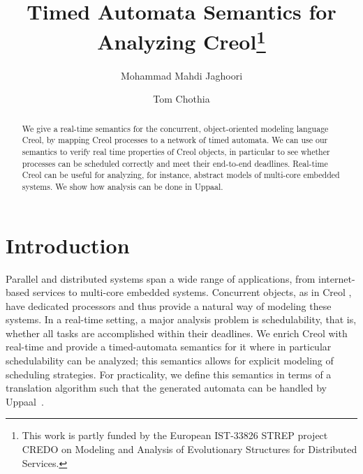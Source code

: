 \documentclass[copyright,creativecommons]{eptcs}
\theoremstyle{definition}
\newcommand{\Uppaal}{{\sc Uppaal}\xspace}
\begin{document}
\title{Timed Automata Semantics for Analyzing Creol\thanks{This work is partly funded by the European IST-33826 STREP project CREDO on Modeling and Analysis of Evolutionary Structures for Distributed Services.}}

\def\titlerunning{Timed Automata Semantics for Analyzing Creol}  

\author{
Mohammad Mahdi Jaghoori
\and
Tom Chothia
}

\def\authorrunning{M. Jaghoori and T. Chothia}   


\maketitle



\begin{abstract}
We give a real-time semantics for the concurrent, object-oriented modeling language Creol, by mapping Creol processes to a network of timed automata. We can use our semantics to verify real time properties of Creol objects, in particular to see whether processes can be scheduled correctly and meet their end-to-end deadlines.
Real-time Creol can be useful for analyzing, for instance, abstract models of multi-core embedded systems.
We show how
analysis can be done
in \Uppaal.


\end{abstract}





\section{Introduction}
Parallel and distributed systems span a wide range of applications, from internet-based services to multi-core embedded systems.
Concurrent objects, as in Creol \cite{johnsen07sosym}, have dedicated processors and thus provide a natural way of modeling these systems.
In a real-time setting, a major analysis problem is schedulability, that is, whether all tasks are accomplished within their deadlines.
We enrich Creol with real-time and provide  a timed-automata semantics for it where in particular schedulability can be analyzed; this semantics allows for explicit modeling of  scheduling strategies.
For practicality, we define this semantics in terms of a translation algorithm such that the generated automata can be handled by \Uppaal\ \cite{LarsenPY97}.
\end{document}
